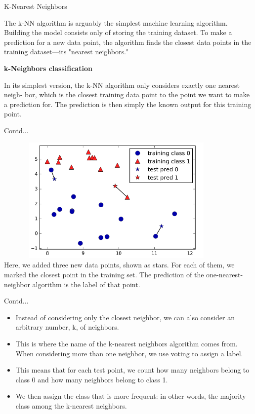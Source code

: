 \documentclass{beamer}
\newcommand\myheading[1]{%
  \par\bigskip
  {\Large\bfseries#1}\par\smallskip}
\begin{document}
\begin{frame}{K-Nearest Neighbors}
\begin{flushleft}
		The k-NN algorithm is arguably the simplest machine learning algorithm. Building the model consists only of storing the training dataset. To make a prediction for a new data point, the algorithm finds the closest data points in the training dataset—its "nearest neighbors."
\myheading{k-Neighbors classification}
In its simplest version, the k-NN algorithm only considers exactly one nearest neigh‐
bor, which is the closest training data point to the point we want to make a prediction
for. The prediction is then simply the known output for this training point.
\end{flushleft}
\end{frame}

\begin{frame}{Contd...}
\begin{flushleft}
\includegraphics[height= 6.2cm, width=12cm]{KNN_example1}\\
		Here, we added three new data points, shown as stars. For each of them, we marked the closest point in the training set. The prediction of the one-nearest-neighbor algorithm is the label of that point.
\end{flushleft}
\end{frame}

\begin{frame}{Contd...}
\begin{flushleft}
\begin{itemize}
	\item Instead of considering only the closest neighbor, we can also consider an arbitrary number, k, of neighbors.
	\item This is where the name of the k-nearest neighbors algorithm comes from. When considering more than one neighbor, we use voting to assign a label.
	\item This means that for each test point, we count how many neighbors belong to class 0 and how many neighbors belong to class 1.
	\item We then assign the class that is more frequent: in other words, the majority class among the k-nearest neighbors.
\end{itemize}
	\end{flushleft}
\end{frame}
\end{document}
